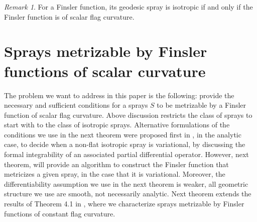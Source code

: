 \documentclass[oneside,english]{amsart}
\numberwithin{equation}{section}
\numberwithin{figure}{section}
\theoremstyle{plain}
\theoremstyle{plain}
\theoremstyle{definition}
\theoremstyle{plain}
\theoremstyle{plain}
\theoremstyle{plain}
\theoremstyle{remark}
\newtheorem{rem}[thm]{Remark}
\theoremstyle{remark}
\begin{document}
\begin{rem} For a Finsler function, its geodesic spray is
isotropic if and only if the Finsler function is of scalar flag
curvature.\end{rem}

\section{Sprays metrizable by Finsler functions of scalar curvature}
\label{sec:scalar_metrizable}


The problem we want to address in this paper is the following: provide the
necessary and sufficient conditions for a sprays $S$ to be metrizable by a
Finsler function of scalar flag curvature. Above discussion restricts the
class of sprays to start with to the class of isotropic sprays. Alternative
formulations of the conditions we use in the next theorem were proposed first
in \cite[Thm 7.2]{GM00}, in the analytic case, to decide when a non-flat
isotropic spray is variational, by discussing the formal integrability of an
associated partial differential operator. However, next theorem, will provide
an algorithm to construct the Finsler function that metricizes a given spray,
in the case that it is variational. Moreover, the differentiability assumption
we use in the next theorem is weaker, all geometric structure we use are
smooth, not necessarily analytic. Next theorem extends the results of Theorem
4.1 in \cite{BM13}, where we characterize sprays metrizable by Finsler
functions of constant flag curvature.
\end{document}
